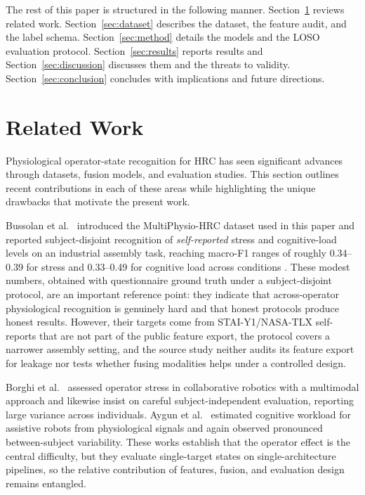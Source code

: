 \documentclass{llncs}
\begin{document}
The rest of this paper is structured in the following manner. Section~\ref{sec:related}
reviews related work. Section~\ref{sec:dataset} describes the dataset, the feature
audit, and the label schema. Section~\ref{sec:method} details the models and the
\ac{LOSO} evaluation protocol. Section~\ref{sec:results} reports results and
Section~\ref{sec:discussion} discusses them and the threats to validity.
Section~\ref{sec:conclusion} concludes with implications and future directions.

\section{Related Work}
\label{sec:related}

Physiological operator-state recognition for \ac{HRC} has seen significant advances
through datasets, fusion models, and evaluation studies. This section outlines recent
contributions in each of these areas while highlighting the unique drawbacks that
motivate the present work.

Bussolan et al.~\cite{bussolan2025multiphysiohrc} introduced the MultiPhysio-\ac{HRC}
dataset used in this paper and reported subject-disjoint recognition of
\emph{self-reported} stress and cognitive-load levels on an industrial assembly task,
reaching macro-F1 ranges of roughly 0.34--0.39 for stress and 0.33--0.49 for cognitive
load across conditions \cite{bussolan2024stressdetector}. These modest numbers,
obtained with questionnaire ground truth under a subject-disjoint protocol, are an
important reference point: they indicate that across-operator physiological
recognition is genuinely hard and that honest protocols produce honest results.
However, their targets come from STAI-Y1/NASA-TLX self-reports that are not part of
the public feature export, the protocol covers a narrower assembly setting, and the
source study neither audits its feature export for leakage nor tests whether fusing
modalities helps under a controlled design.

Borghi et al.~\cite{borghi2025operatorstress} assessed operator stress in collaborative
robotics with a multimodal approach and likewise insist on careful subject-independent
evaluation, reporting large variance across individuals. Aygun et al.~\cite{aygun2022assistive}
estimated cognitive workload for assistive robots from physiological signals and again
observed pronounced between-subject variability. These works establish that the
operator effect is the central difficulty, but they evaluate single-target states on
single-architecture pipelines, so the relative contribution of features, fusion, and
evaluation design remains entangled.
\end{document}
